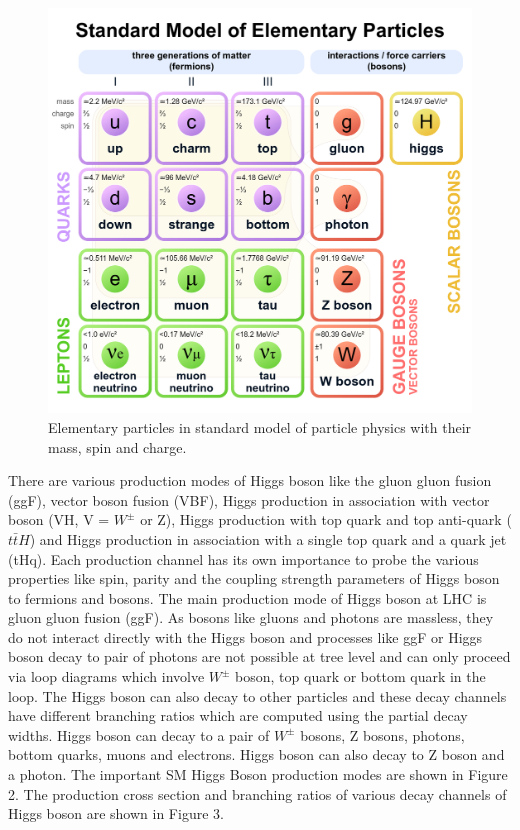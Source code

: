 \documentclass[final,3p]{CSP}
\begin{document}
\begin{figure}[H]
	\centering
	\includegraphics[width= 0.5 \columnwidth]{./sm.png}
	\caption{Elementary particles in standard model of particle physics with their mass, spin and charge.}
	\label{figure 1}
\end{figure}


There are various production modes of Higgs boson like the gluon gluon fusion (ggF), vector boson fusion (VBF), Higgs 
production in association with vector boson (VH, V = $W^{\pm}$ or Z), Higgs production with top quark and top anti-quark ($t\bar{t}H$) and Higgs 
production in association with a single top quark and a quark jet (tHq). Each production channel has its own importance to probe the 
various properties like spin, parity and the coupling strength parameters of Higgs boson to fermions and bosons. The main production mode of Higgs boson at LHC is 
gluon gluon fusion (ggF). As bosons like gluons and photons are massless, they do not interact directly with the Higgs boson 
and processes like ggF or Higgs boson decay to pair of photons are not possible at tree level and can only proceed via loop 
diagrams which involve $W^{\pm}$ boson, top quark or bottom quark in the loop. The Higgs boson can also decay to other particles and these decay 
channels have different branching ratios which are computed using the partial decay widths. Higgs boson can decay to a pair of $W^{\pm}$ bosons, Z bosons, photons, bottom quarks, 
muons and electrons. Higgs boson can also decay to Z boson and a photon. The important SM Higgs Boson production modes are shown in Figure 2. The production cross section and branching ratios of various decay channels of Higgs boson are shown in Figure 3.
\end{document}
